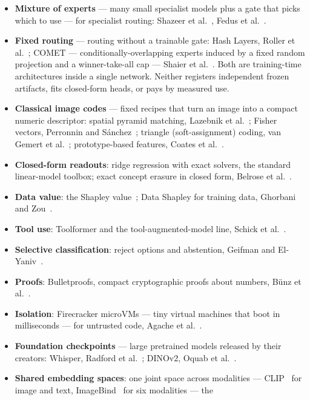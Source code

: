 \documentclass[11pt]{article}
\begin{document}
\begin{itemize}
\item \textbf{Mixture of experts} --- many small specialist models
plus a gate that picks which to use --- for specialist routing:
Shazeer et al.~\cite{shazeer2017}, Fedus et al.~\cite{fedus2022}.
\item \textbf{Fixed routing} --- routing without a trainable gate:
Hash Layers, Roller et al.~\cite{roller2021}; COMET ---
conditionally-overlapping experts induced by a fixed random
projection and a winner-take-all cap --- Shaier et
al.~\cite{shaier2025}. Both are training-time architectures inside
a single network. Neither registers independent frozen artifacts,
fits closed-form heads, or pays by measured use.
\item \textbf{Classical image codes} --- fixed recipes that turn an
image into a compact numeric descriptor: spatial pyramid matching,
Lazebnik et al.~\cite{lazebnik2006}; Fisher vectors, Perronnin and
S\'anchez~\cite{perronnin2013}; triangle (soft-assignment) coding,
van Gemert et al.~\cite{vangemert2010}; prototype-based features,
Coates et al.~\cite{coates2011}.
\item \textbf{Closed-form readouts}: ridge regression with exact
solvers, the standard linear-model toolbox; exact concept erasure
in closed form, Belrose et al.~\cite{belrose2023}.
\item \textbf{Data value}: the Shapley value~\cite{shapley1953};
Data Shapley for training data, Ghorbani and
Zou~\cite{ghorbani2019}.
\item \textbf{Tool use}: Toolformer and the tool-augmented-model
line, Schick et al.~\cite{schick2023}.
\item \textbf{Selective classification}: reject options and
abstention, Geifman and El-Yaniv~\cite{geifman2017}.
\item \textbf{Proofs}: Bulletproofs, compact cryptographic proofs
about numbers, B\"unz et al.~\cite{bunz2018}.
\item \textbf{Isolation}: Firecracker microVMs --- tiny virtual
machines that boot in milliseconds --- for untrusted code,
Agache et al.~\cite{agache2020}.
\item \textbf{Foundation checkpoints} --- large pretrained models
released by their creators: Whisper, Radford et
al.~\cite{radford2023}; DINOv2, Oquab et al.~\cite{oquab2024}.
\item \textbf{Shared embedding spaces}: one joint space across
modalities --- CLIP~\cite{clip2021} for image and text,
ImageBind~\cite{imagebind2023} for six modalities --- the

\end{itemize}
\end{document}
